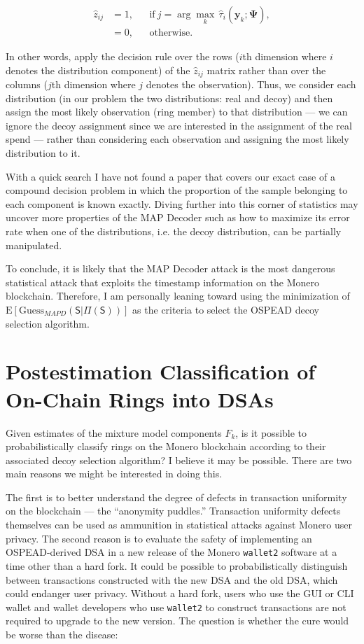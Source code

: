 \documentclass[english]{article}
\begin{document}
\[
\begin{array}{cccc}
\hat{z}_{ij} & =1, &  & \mathrm{if}\:j=\arg\underset{k}{\max}\,\hat{\tau}_{i}(\boldsymbol{y}_{k};\hat{\boldsymbol{\Psi}}),\\
 & =0, &  & \mathrm{otherwise.\qquad\qquad\qquad}
\end{array}
\]

In other words, apply the decision rule over the rows ($i$th dimension
where $i$ denotes the distribution component) of the $\hat{z}_{ij}$
matrix rather than over the columns ($j$th dimension where $j$ denotes
the observation). Thus, we consider each distribution (in our problem
the two distributions: real and decoy) and then assign the most likely
observation (ring member) to that distribution --- we can ignore
the decoy assignment since we are interested in the assignment of
the real spend --- rather than considering each observation and assigning
the most likely distribution to it.

With a quick search I have not found a paper that covers our exact
case of a compound decision problem in which the proportion of the
sample belonging to each component is known exactly. Diving further
into this corner of statistics may uncover more properties of the
MAP Decoder such as how to maximize its error rate when one of the
distributions, i.e. the decoy distribution, can be partially manipulated.

To conclude, it is likely that the MAP Decoder attack is the most
dangerous statistical attack that exploits the timestamp information
on the Monero blockchain. Therefore, I am personally leaning toward
using the minimization of $\mathrm{E}\left[\mathrm{Guess}_{MAPD}\left(\mathsf{S}|\Pi(\mathsf{S})\right)\right]$
as the criteria to select the OSPEAD decoy selection algorithm.

\section{Postestimation Classification of On-Chain Rings into DSAs\label{sec:Postestimation-Classification}}

Given estimates of the mixture model components $F_{k}$, is it possible
to probabilistically classify rings on the Monero blockchain according
to their associated decoy selection algorithm? I believe it may be
possible. There are two main reasons we might be interested in doing
this.

The first is to better understand the degree of defects in transaction
uniformity on the blockchain --- the ``anonymity puddles.'' Transaction
uniformity defects themselves can be used as ammunition in statistical
attacks against Monero user privacy. The second reason is to evaluate
the safety of implementing an OSPEAD-derived DSA in a new release
of the Monero \texttt{wallet2} software at a time other than a hard
fork. It could be possible to probabilistically distinguish between
transactions constructed with the new DSA and the old DSA, which could
endanger user privacy. Without a hard fork, users who use the GUI
or CLI wallet and wallet developers who use \texttt{wallet2} to construct
transactions are not required to upgrade to the new version. The question
is whether the cure would be worse than the disease:
\end{document}
